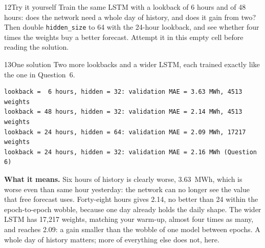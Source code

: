 
\begin{labquestion}{12}{Try it yourself}
Train the same LSTM with a lookback of 6 hours and of 48 hours: does the network need a whole day of history, and does it gain from two? Then double \texttt{hidden\_size} to 64 with the 24-hour lookback, and see whether four times the weights buy a better forecast. Attempt it in this empty cell before reading the solution.
\end{labquestion}

\begin{labquestion}{13}{One solution}
Two more lookbacks and a wider LSTM, each trained exactly like the one in Question~6.
\end{labquestion}
\begin{labanswer}

\begin{refoutput}
\begin{lstlisting}[style=utpterminal]
lookback =  6 hours, hidden = 32: validation MAE = 3.63 MWh, 4513 weights
lookback = 48 hours, hidden = 32: validation MAE = 2.14 MWh, 4513 weights
lookback = 24 hours, hidden = 64: validation MAE = 2.09 MWh, 17217 weights
lookback = 24 hours, hidden = 32: validation MAE = 2.16 MWh (Question 6)
\end{lstlisting}
\end{refoutput}

\textbf{What it means.} Six hours of history is clearly worse, 3.63~MWh, which is worse even than same hour yesterday: the network can no longer see the value that free forecast uses. Forty-eight hours gives 2.14, no better than 24 within the epoch-to-epoch wobble, because one day already holds the daily shape. The wider LSTM has 17,217 weights, matching your warm-up, almost four times as many, and reaches 2.09: a gain smaller than the wobble of one model between epochs. A whole day of history matters; more of everything else does not, here.
\end{labanswer}


